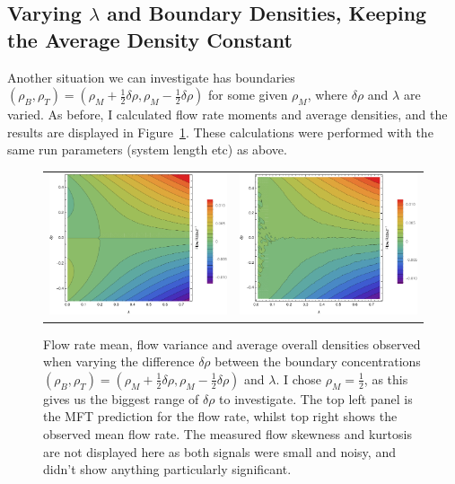 \subsection{Varying $\lambda$ and Boundary Densities, Keeping the Average Density Constant}
Another situation we can investigate has boundaries $(\rho_B, \rho_T) = (\rho_M + \frac{1}{2} \delta\rho, \rho_M - \frac{1}{2} \delta\rho)$ for some given $\rho_M$, where $\delta\rho$ and $\lambda$ are varied. As before, I calculated flow rate
moments and average densities, and the results are displayed in Figure~\ref{fig:constDens}. These calculations were performed with the same run parameters (system length etc)
as above.

\begin{figure}[h!]
\vspace{1em}
\caption{\label{fig:constDens} Flow rate mean, flow variance and average overall densities observed when varying the difference $\delta\rho$ between the boundary concentrations
$(\rho_B, \rho_T) = (\rho_M + \frac{1}{2} \delta\rho, \rho_M - \frac{1}{2} \delta\rho)$ and $\lambda$. I chose $\rho_M=\frac{1}{2}$, as this gives us the biggest range of $\delta\rho$ to investigate. The top left panel is the MFT prediction
for the flow rate, whilst top right shows the observed mean flow rate. The measured flow skewness and kurtosis are not displayed here as both signals were small and noisy, and didn't show anything particularly significant.}
\begin{center}
 \begin{tabular}{c|c}
    \includegraphics[width=0.5\linewidth]{../tex-src/images/constDens/constAnalFlow-crop} & \includegraphics[width=0.5\linewidth]{../tex-src/images/constDens/meanFlowContour-crop} \\

\end{tabular}
\end{center}
\end{figure}
